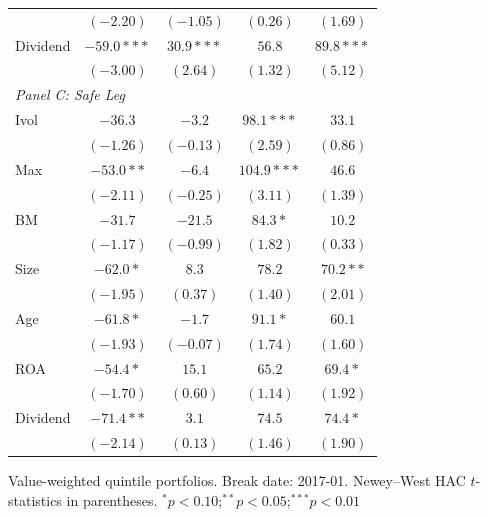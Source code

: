 \begin{tabular}{l c c c c}
 & $(-2.20)$ & $(-1.05)$ & $(0.26)$ & $(1.69)$ \\
Dividend & $-59.0***$ & $30.9***$ & $56.8$ & $89.8***$ \\
 & $(-3.00)$ & $(2.64)$ & $(1.32)$ & $(5.12)$ \\
\midrule
\multicolumn{5}{l}{\textit{Panel C: Safe Leg}} \\
Ivol & $-36.3$ & $-3.2$ & $98.1***$ & $33.1$ \\
 & $(-1.26)$ & $(-0.13)$ & $(2.59)$ & $(0.86)$ \\
Max & $-53.0**$ & $-6.4$ & $104.9***$ & $46.6$ \\
 & $(-2.11)$ & $(-0.25)$ & $(3.11)$ & $(1.39)$ \\
BM & $-31.7$ & $-21.5$ & $84.3*$ & $10.2$ \\
 & $(-1.17)$ & $(-0.99)$ & $(1.82)$ & $(0.33)$ \\
Size & $-62.0*$ & $8.3$ & $78.2$ & $70.2**$ \\
 & $(-1.95)$ & $(0.37)$ & $(1.40)$ & $(2.01)$ \\
Age & $-61.8*$ & $-1.7$ & $91.1*$ & $60.1$ \\
 & $(-1.93)$ & $(-0.07)$ & $(1.74)$ & $(1.60)$ \\
ROA & $-54.4*$ & $15.1$ & $65.2$ & $69.4*$ \\
 & $(-1.70)$ & $(0.60)$ & $(1.14)$ & $(1.92)$ \\
Dividend & $-71.4**$ & $3.1$ & $74.5$ & $74.4*$ \\
 & $(-2.14)$ & $(0.13)$ & $(1.46)$ & $(1.90)$ \\
\bottomrule
\end{tabular}
\vspace{4pt}
\begin{minipage}{0.9\textwidth}
\footnotesize
Value-weighted quintile portfolios. Break date: 2017-01.
Newey--West HAC $t$-statistics in parentheses.
$^{*}p<0.10$;\quad $^{**}p<0.05$;\quad $^{***}p<0.01$
\end{minipage}